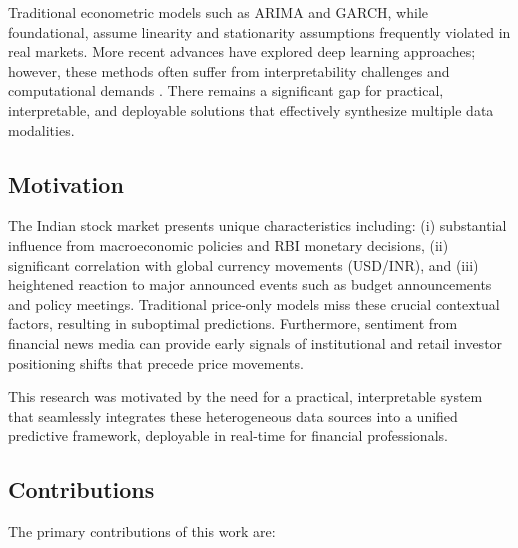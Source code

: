 \documentclass[conference]{IEEEtran}
\begin{document}
Traditional econometric models such as ARIMA and GARCH, while foundational, assume linearity and stationarity assumptions frequently violated in real markets. More recent advances have explored deep learning approaches; however, these methods often suffer from interpretability challenges and computational demands \cite{fischer2018deep}. There remains a significant gap for practical, interpretable, and deployable solutions that effectively synthesize multiple data modalities.

\subsection{Motivation}

The Indian stock market presents unique characteristics including: (i) substantial influence from macroeconomic policies and RBI monetary decisions, (ii) significant correlation with global currency movements (USD/INR), and (iii) heightened reaction to major announced events such as budget announcements and policy meetings. Traditional price-only models miss these crucial contextual factors, resulting in suboptimal predictions. Furthermore, sentiment from financial news media can provide early signals of institutional and retail investor positioning shifts that precede price movements.

This research was motivated by the need for a practical, interpretable system that seamlessly integrates these heterogeneous data sources into a unified predictive framework, deployable in real-time for financial professionals.

\subsection{Contributions}

The primary contributions of this work are:
\end{document}
